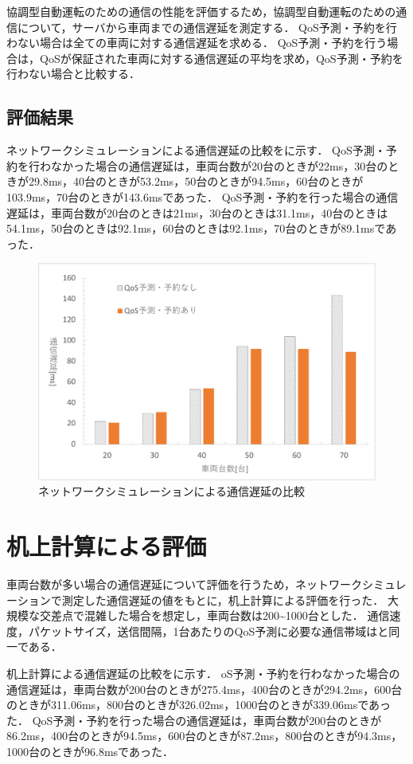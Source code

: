 \documentclass[a4paper,11pt,uplatex]{ujreport}
\begin{document}
  協調型自動運転のための通信の性能を評価するため，協調型自動運転のための通信について，サーバから車両までの通信遅延を測定する．
  QoS予測・予約を行わない場合は全ての車両に対する通信遅延を求める．
  QoS予測・予約を行う場合は，QoSが保証された車両に対する通信遅延の平均を求め，QoS予測・予約を行わない場合と比較する．


\subsection{評価結果}
\label{sec:NSの評価結果}

  ネットワークシミュレーションによる通信遅延の比較をに示す．
  QoS予測・予約を行わなかった場合の通信遅延は，車両台数が20台のときが22ms，30台のときが29.8ms，40台のときが53.2ms，50台のときが94.5ms，60台のときが103.9ms，70台のときが143.6msであった．
  QoS予測・予約を行った場合の通信遅延は，車両台数が20台のときは21ms，30台のときは31.1ms，40台のときは54.1ms，50台のときは92.1ms，60台のときは92.1ms，70台のときが89.1msであった．
  
  \begin{figure}[tb]
    \centering
    \includegraphics[width=\linewidth]{img/ネットワークシミュレーションによる通信遅延の比較.pdf}
    \caption{ネットワークシミュレーションによる通信遅延の比較}
    \label{fig:NSdelay}
  \end{figure}

\section{机上計算による評価}
\label{sec:Math評価}

車両台数が多い場合の通信遅延について評価を行うため，ネットワークシミュレーションで測定した通信遅延の値をもとに，机上計算による評価を行った．
大規模な交差点で混雑した場合を想定し，車両台数は200\textasciitilde1000台とした．
通信速度，パケットサイズ，送信間隔，1台あたりのQoS予測に必要な通信帯域はと同一である．\par
机上計算による通信遅延の比較をに示す．
oS予測・予約を行わなかった場合の通信遅延は，車両台数が200台のときが275.4ms，400台のときが294.2ms，600台のときが311.06ms，800台のときが326.02ms，1000台のときが339.06msであった．
QoS予測・予約を行った場合の通信遅延は，車両台数が200台のときが86.2ms，400台のときが94.5ms，600台のときが87.2ms，800台のときが94.3ms，1000台のときが96.8msであった．
\end{document}
